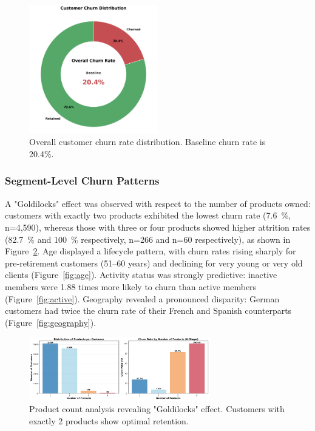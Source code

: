 \documentclass[12pt]{article}
\begin{document}
\begin{figure}[H]
\centering
\includegraphics[width=0.5\textwidth]{../img/04_products_donut_chart.png}
\caption{Overall customer churn rate distribution. Baseline churn rate is 20.4\%.}
\label{fig:churn_rate}
\end{figure}

\subsubsection{Segment-Level Churn Patterns}
A "Goldilocks" effect was observed with respect to the number of products owned: customers with exactly two products exhibited the lowest churn rate (7.6~\%, n=4,590), whereas those with three or four products showed higher attrition rates (82.7~\% and 100~\% respectively, n=266 and n=60 respectively), as shown in Figure~\ref{fig:products}. Age displayed a lifecycle pattern, with churn rates rising sharply for pre‑retirement customers (51–60 years) and declining for very young or very old clients (Figure~\ref{fig:age}). Activity status was strongly predictive: inactive members were 1.88 times more likely to churn than active members (Figure~\ref{fig:active}). Geography revealed a pronounced disparity: German customers had twice the churn rate of their French and Spanish counterparts (Figure~\ref{fig:geography}).

\begin{figure}[H]
\centering
\includegraphics[width=0.7\textwidth]{../img/04_products_churn_analysis.png}
\caption{Product count analysis revealing "Goldilocks" effect. Customers with exactly 2 products show optimal retention.}
\label{fig:products}
\end{figure}
\end{document}
